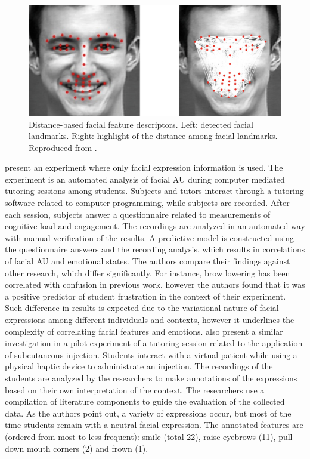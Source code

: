 \begin{figure}[h!]
    \centering
    \includegraphics[width=\linewidth]{figures/samara2016sensing-distances.png}
    \caption{Distance-based facial feature descriptors. Left: detected facial landmarks. Right: highlight of the distance among facial landmarks. Reproduced from \parencite{samara2016sensing}.}
    \label{fig:distance-samara}
\end{figure}

\textcite{grafsgaard2013automatically} present an experiment where only facial expression information is used. The experiment is an automated analysis of facial AU during computer mediated tutoring sessions among students. Subjects and tutors interact through a tutoring software related to computer programming, while subjects are recorded. After each session, subjects answer a questionnaire related to measurements of cognitive load and engagement. The recordings are analyzed in an automated way with manual verification of the results. A predictive model is constructed using the questionnaire answers and the recording analysis, which results in correlations of facial AU and emotional states. The authors compare their findings against other research, which differ significantly. For instance, brow lowering has been correlated with confusion in previous work, however the authors found that it was a positive predictor of student frustration in the context of their experiment. Such difference in results is expected due to the variational nature of facial expressions among different individuals and contexts, however it underlines the complexity of correlating facial features and emotions. \textcite{heylen2005facial} also present a similar investigation in a pilot experiment of a tutoring session related to the application of subcutaneous injection. Students interact with a virtual patient while using a physical haptic device to administrate an injection. The recordings of the students are analyzed by the researchers to make annotations of the expressions based on their own interpretation of the context. The researchers use a compilation of literature components to guide the evaluation of the collected data. As the authors point out, a variety of expressions occur, but most of the time students remain with a neutral facial expression. The annotated features are (ordered from most to less frequent): smile (total 22), raise eyebrows (11), pull down mouth corners (2) and frown (1).

